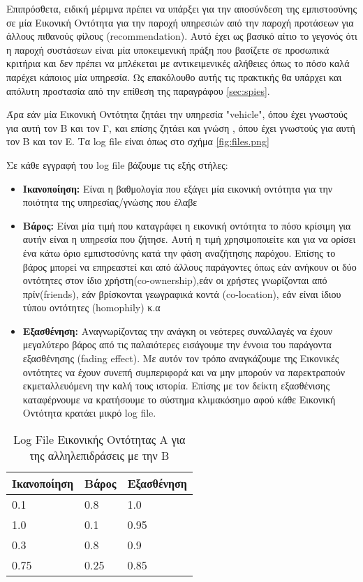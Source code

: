 Επιπρόσθετα, ειδική μέριμνα πρέπει να υπάρξει για την αποσύνδεση της εμπιστοσύνης σε μία Εικονική Οντότητα για την παροχή υπηρεσιών από την παροχή προτάσεων για άλλους πιθανούς φίλους (recommendation). Αυτό έχει ως βασικό αίτιο το γεγονός ότι η παροχή συστάσεων είναι μία υποκειμενική πράξη που βασίζετε σε προσωπικά κριτήρια και δεν πρέπει να μπλέκεται με αντικειμενικές αλήθειες όπως το πόσο καλά παρέχει κάποιος μία υπηρεσία. Ως επακόλουθο αυτής τις πρακτικής θα υπάρχει και απόλυτη προστασία από την επίθεση της παραγράφου \ref{sec:spies}.

Άρα εάν μία Εικονική Οντότητα ζητάει την υπηρεσία "vehicle", όπου έχει γνωστούς για αυτή τον Β και τον Γ, και επίσης ζητάει και γνώση , όπου έχει γνωστούς για αυτή τον Β και τον Ε. Τα log file είναι όπως στο σχήμα \ref{fig:files.png}
\newpage
{}


Σε κάθε εγγραφή του log file βάζουμε τις εξής στήλες:
\begin{itemize}

\item \textbf{Ικανοποίηση:} Είναι η βαθμολογία που εξάγει μία εικονική οντότητα για την ποιότητα της υπηρεσίας/γνώσης που έλαβε

\item \textbf{Βάρος:} Είναι μία τιμή που καταγράφει η εικονική οντότητα το πόσο κρίσιμη για αυτήν είναι η υπηρεσία που ζήτησε. Αυτή η τιμή χρησιμοποιείτε και για να ορίσει ένα κάτω όριο εμπιστοσύνης κατά την φάση αναζήτησης παρόχου. Επίσης το βάρος μπορεί να επηρεαστεί και από άλλους παράγοντες όπως εάν ανήκουν οι δύο οντότητες στον ίδιο χρήστη(co-ownership),εάν οι χρήστες γνωρίζονται από πρίν(friends), εάν βρίσκονται γεωγραφικά κοντά (co-location), εάν είναι ίδιου τύπου οντότητες (homophily) κ.α

\item \textbf{Εξασθένηση:} Αναγνωρίζοντας την ανάγκη οι νεότερες συναλλαγές να έχουν μεγαλύτερο βάρος από τις παλαιότερες εισάγουμε την έννοια του παράγοντα εξασθένησης (fading effect). Με αυτόν τον τρόπο αναγκάζουμε της Εικονικές οντότητες να έχουν συνεπή συμπεριφορά και να μην μπορούν να παρεκτραπούν εκμεταλλευόμενη την καλή τους ιστορία. Επίσης με τον δείκτη εξασθένισης καταφέρνουμε να κρατήσουμε το σύστημα κλιμακόσημο αφού κάθε Εικονική Οντότητα κρατάει μικρό log file.

\end{itemize}

\begin{table}[H]
    \centering
    \begin{tabular}{ | l | l | l | }
        \hline
        Ικανοποίηση & Βάρος & Εξασθένηση \\ \hline \hline
        0.1 & 0.8 & 1.0  \\ \hline
        1.0 & 0.1 & 0.95  \\ \hline
        0.3 & 0.8 & 0.9  \\ \hline
        0.75 & 0.25 & 0.85  \\ \hline
    \end{tabular}
    \caption{Log File Εικονικής Οντότητας Α για της αλληλεπιδράσεις με την Β}
    \label{tab:log file}
\end{table}

